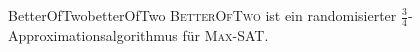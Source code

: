 \documentclass[language=ngerman,algolist]{TemplateLecture}
\begin{document}
\begin{algorithm}[h]
    \caption{\textsc{BetterOfTwo}}\label{alg:betterOfTwo}
    \begin{algorithmic}[1]
    \end{algorithmic}
\end{algorithm}

\begin{thm}{BetterOfTwo}{betterOfTwo}
    \textsc{BetterOfTwo} ist ein randomisierter $\frac{3}{4}$-Approximationsalgorithmus für \textsc{Max-SAT}.
\end{thm}
\end{document}
